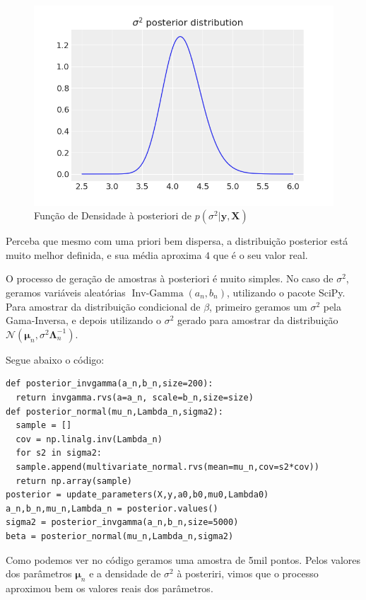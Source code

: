 \documentclass[12pt,letterpaper]{article}
\newcommand{\bd}[1]{\boldsymbol{#1}}
\newcommand{\op}{\operatorname}
\newcommand{\norm}{\mathcal{N}}
\begin{document}
	\begin{figure}[!htb]
		\centering
		\includegraphics[scale=0.7]{../images/sigma2_posterior.png}
		\caption{Função de Densidade à posteriori de $p(\sigma^2|\bd y,\bd X)$}
		\label{sig2post}
	\end{figure}

	Perceba que mesmo com uma priori bem dispersa, a distribuição posterior está muito melhor definida, e sua média aproxima $4$ que é o seu valor real.
	
	O processo de geração de amostras à posteriori é muito simples. No caso de $\sigma^2$, geramos variáveis aleatórias $\op{Inv-Gamma}(a_n,b_n)$, utilizando o pacote SciPy. Para amostrar da distribuição condicional de $\beta$, primeiro geramos um $\sigma^2$ pela Gama-Inversa, e depois utilizando o $\sigma^2$ gerado para amostrar da distribuição $\norm(\bd\mu_n,\sigma^2\bd\Lambda_n^{-1})$.
	
	Segue abaixo o código:
	
	\begin{lstlisting}[language=iPython]
def posterior_invgamma(a_n,b_n,size=200):
  return invgamma.rvs(a=a_n, scale=b_n,size=size)
def posterior_normal(mu_n,Lambda_n,sigma2):
  sample = []
  cov = np.linalg.inv(Lambda_n)
  for s2 in sigma2:
  sample.append(multivariate_normal.rvs(mean=mu_n,cov=s2*cov))
  return np.array(sample)
posterior = update_parameters(X,y,a0,b0,mu0,Lambda0)
a_n,b_n,mu_n,Lambda_n = posterior.values()
sigma2 = posterior_invgamma(a_n,b_n,size=5000)
beta = posterior_normal(mu_n,Lambda_n,sigma2)
	\end{lstlisting}

	Como podemos ver no código geramos uma amostra de 5mil pontos. Pelos valores dos parâmetros $\bd\mu_n$ e a densidade de $\sigma^2$ à posteriri, vimos que o processo aproximou bem os valores reais dos parâmetros.
	
\end{document}
